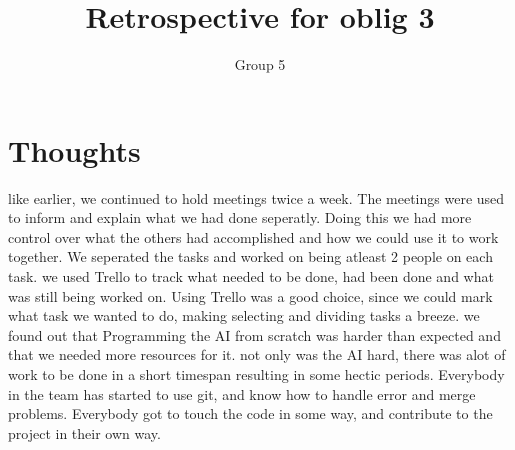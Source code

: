 \documentclass{article}
\title{Retrospective for oblig 3}
\author{Group 5}
\date{}
\begin{document}
    \maketitle

    \section{Thoughts}
    \noindent
     like earlier, we continued to hold meetings twice a week. The meetings were used to inform and explain what we had
     done seperatly. Doing this we had more control over what the others had accomplished and how we could use it to work together.
     We seperated the tasks and worked on being atleast 2 people on each task. we used Trello to track what needed to be done,
     had been done and what was still being worked on. Using Trello was a good choice, since we could mark what task we
     wanted to do, making selecting and dividing tasks a breeze. we found out that Programming the AI from scratch was harder than expected
     and that we needed more resources for it. not only was the AI hard, there was alot of work to be done in a short timespan
     resulting in some hectic periods. Everybody in the team has started to use git, and know how to handle error and merge problems.
     Everybody got to touch the code in some way, and contribute to the project in their own way.
\end{document}
